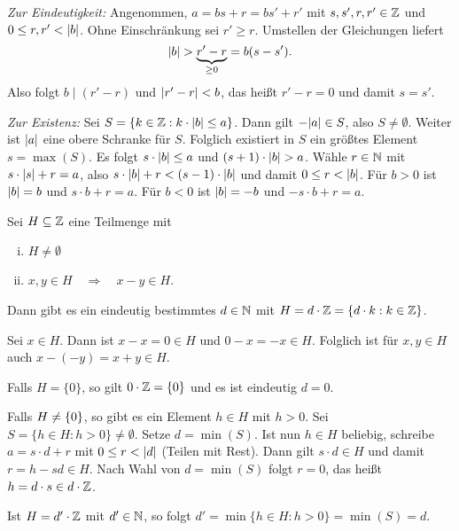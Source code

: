 	\begin{beweis}
		\textit{Zur Eindeutigkeit:} Angenommen, $a = bs + r = bs' + r'$ mit $s,s',r,r' \in \mathbb{Z}$ und $0 \leq r,r' < \left\lvert b\right\rvert$.
		Ohne Einschränkung sei $r' \geq r$.
		Umstellen der Gleichungen liefert
		\[
			\left\lvert b\right\rvert > \underbrace{r' - r}_{\geq 0} = b(s - s').
		\]
		Also folgt $b \mid (r'-r)$ und $\left\lvert r' - r\right\rvert < b$, das heißt $r' - r = 0$ und damit $s = s'$.
		
		\textit{Zur Existenz:} Sei $S = \{k \in \mathbb{Z} : k \cdot \left\lvert b\right\rvert \leq a\}$. 
		Dann gilt $-\abs{a} \in S$, also $S \neq \emptyset$.
		Weiter ist $\left\lvert a\right\rvert$ eine obere Schranke für $S$.
		Folglich existiert in $S$ ein größtes Element $s = \max(S)$.
		Es folgt $s \cdot \left\lvert b\right\rvert \leq a$ und $(s+1) \cdot \left\lvert b\right\rvert > a$.
		Wähle $r \in \mathbb{N}$ mit $s \cdot \left\lvert s\right\rvert + r = a$, also $s \cdot \left\lvert b\right\rvert + r < (s-1) \cdot \left\lvert b\right\rvert$ und damit $0 \leq r < \left\lvert b\right\rvert$.
		Für $b>0$ ist $\left\lvert b\right\rvert = b$ und $s \cdot b + r = a$.
		Für $b<0$ ist $\left\lvert b\right\rvert = -b$ und $-s \cdot b + r = a$.
	\end{beweis}

	\begin{satz}
		Sei $H \subseteq \mathbb{Z}$ eine Teilmenge  mit \marginnote{[6]}
		\begin{enumerate}[(i)]
			\item $H \neq \emptyset$
			\item $x,y \in H \quad \Rightarrow \quad x-y \in H$.
		\end{enumerate}
		Dann gibt es ein eindeutig bestimmtes $d \in \mathbb{N}$ mit $H = d \cdot \mathbb{Z} = \{d \cdot k : k \in \mathbb{Z}\}$.
	\end{satz}

	\begin{beweis}
		Sei $x \in H$.
		Dann ist $x-x = 0 \in H$ und $0-x = -x \in H$.
		Folglich ist für $x,y \in H$ auch $x -(-y) = x+y \in H$.
		
		Falls $H = \{0\}$, so gilt $0 \cdot \mathbb{Z} = \{0\}$ und es ist eindeutig $d = 0$.
		
		Falls $H \neq \{0\}$, so gibt es ein Element $h \in H$ mit $h > 0$.
		Sei $S = \{h \in H : h > 0\} \neq \emptyset$.
		Setze $d = \min(S)$.
		Ist nun $h \in H$ beliebig, schreibe $a = s\cdot d + r$ mit $0 \leq r < \left\lvert d\right\rvert$ (Teilen mit Rest).
		Dann gilt $s \cdot d \in H$ und damit $r = h-sd \in H$.
		Nach Wahl von $d = \min(S)$ folgt $r = 0$, das heißt $h = d \cdot s \in d \cdot \mathbb{Z}$.
		
		Ist $H = d' \cdot \mathbb{Z}$ mit $d' \in \mathbb{N}$, so folgt $d' = \min\{h \in H : h > 0\} = \min(S) = d$.
	\end{beweis}


